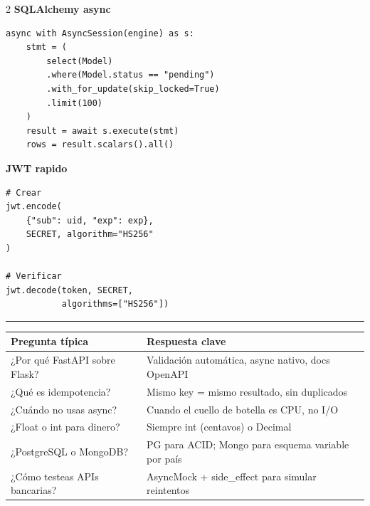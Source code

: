 \documentclass[11pt,a4paper]{article}
\begin{document}
\begin{multicols}{2}
\textbf{\textcolor{pyblue}{SQLAlchemy async}}
\begin{lstlisting}[style=python,numbers=none]
async with AsyncSession(engine) as s:
    stmt = (
        select(Model)
        .where(Model.status == "pending")
        .with_for_update(skip_locked=True)
        .limit(100)
    )
    result = await s.execute(stmt)
    rows = result.scalars().all()
\end{lstlisting}

\textbf{\textcolor{pyblue}{JWT rapido}}
\begin{lstlisting}[style=python,numbers=none]
# Crear
jwt.encode(
    {"sub": uid, "exp": exp},
    SECRET, algorithm="HS256"
)

# Verificar
jwt.decode(token, SECRET,
           algorithms=["HS256"])
\end{lstlisting}

\end{multicols}

\vspace{1em}
\noindent\textcolor{pyblue}{\rule{\linewidth}{0.8pt}}
\vspace{0.5em}

\begin{center}
\begin{tabular}{p{5cm} p{8cm}}
\toprule
\textbf{Pregunta típica} & \textbf{Respuesta clave} \\
\midrule
¿Por qué FastAPI sobre Flask?
  & Validación automática, async nativo, docs OpenAPI \\
¿Qué es idempotencia?
  & Mismo key = mismo resultado, sin duplicados \\
¿Cuándo no usas async?
  & Cuando el cuello de botella es CPU, no I/O \\
¿Float o int para dinero?
  & Siempre int (centavos) o Decimal \\
¿PostgreSQL o MongoDB?
  & PG para ACID; Mongo para esquema variable por país \\
¿Cómo testeas APIs bancarias?
  & AsyncMock + side\_effect para simular reintentos \\
\bottomrule
\end{tabular}
\end{center}
\end{document}
